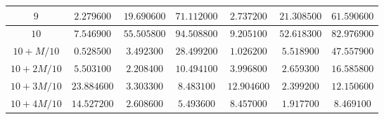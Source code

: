 \begin{landscape}
\begin{table}[]
\begin{tabular}{|c|c|c|c|c|c|c|}
$9$          & $2.279600$                                                   & $19.690600$                                                  & $71.112000$                                                  & $2.737200$                                                         & $21.308500$                                                        & \multicolumn{1}{c|}{$61.590600$}                                                        \\ \hline
$10$         & $7.546900$                                                   & $55.505800$                                                  & $94.508800$                                                  & $9.205100$                                                         & $52.618300$                                                        & \multicolumn{1}{c|}{$82.976900$}                                                        \\ \hline
$10 + M/10$  & $0.528500$                                                   & $3.492300$                                                   & $28.499200$                                                  & $1.026200$                                                         & $5.518900$                                                         & \multicolumn{1}{c|}{$47.557900$}                                                        \\ \hline
$10 + 2M/10$ & $5.503100$                                                   & $2.208400$                                                   & $10.494100$                                                  & $3.996800$                                                         & $2.659300$                                                         & \multicolumn{1}{c|}{$16.585800$}                                                        \\ \hline
$10 + 3M/10$ & $23.884600$                                                  & $3.303300$                                                   & $8.483100$                                                   & $12.904600$                                                        & $2.399200$                                                         & \multicolumn{1}{c|}{$12.150600$}                                                        \\ \hline
$10 + 4M/10$ & $14.527200$                                                  & $2.608600$                                                   & $5.493600$                                                   & $8.457000$                                                         & $1.917700$                                                         & \multicolumn{1}{c|}{$8.469100$}                                                         \\ \hline

\end{tabular}
\end{table}
\end{landscape}
